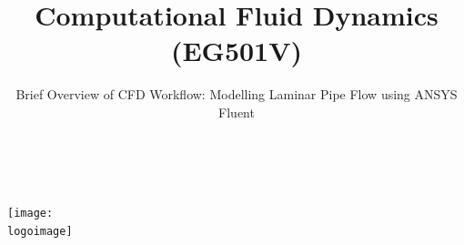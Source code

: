 \documentclass[10pt,compress]{beamer}
\institute{School of Engineering}
\subtitle{Brief Overview of CFD Workflow: Modelling Laminar Pipe Flow using ANSYS Fluent}
\title{Computational Fluid Dynamics (EG501V)}
\date[]{}
\author[\shortname]{%
  \fullname\\\ttfamily{\emailaddress}
}
\newcommand{\logoimage}{./FigBanner/UoAHorizBanner}
\begin{document}
\begin{frame}
  \titlepage
  \vfill%
  \begin{center}
    \texttt{[image: \\logoimage]}
  \end{center}
\end{frame}






\end{document}
